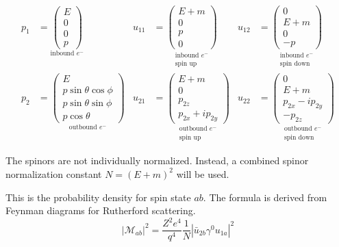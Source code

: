 \begin{align*}
p_1&=\underset{\text{inbound $e^-$}}
{\begin{pmatrix}E\\0\\0\\p\end{pmatrix}}
& u_{11}&=\underset{\substack{\text{inbound $e^-$}\\\text{spin up}}}
{\begin{pmatrix}E+m\\0\\p\\0\end{pmatrix}}
& u_{12}&=\underset{\substack{\text{inbound $e^-$}\\\text{spin down}}}
{\begin{pmatrix}0\\E+m\\0\\-p\end{pmatrix}}
\\[1ex]
p_2&=
\underset{\text{outbound $e^-$}}
{\begin{pmatrix}
E\\
p\sin\theta\cos\phi\\
p\sin\theta\sin\phi\\
p\cos\theta
\end{pmatrix}}
& u_{21}&=\underset{\substack{\text{outbound $e^-$}\\\text{spin up}}}
{\begin{pmatrix}E+m\\0\\p_{2z}\\p_{2x}+ip_{2y}\end{pmatrix}}
& u_{22}&=\underset{\substack{\text{outbound $e^-$}\\\text{spin down}}}
{\begin{pmatrix}0\\E+m\\p_{2x}-ip_{2y}\\-p_{2z}\end{pmatrix}}
\end{align*}
\fi

The spinors are not individually normalized.
Instead, a combined spinor normalization constant $N=(E+m)^2$ will be used.

\bigskip
This is the probability density for spin state $ab$.
The formula is derived from Feynman diagrams for Rutherford scattering.
\begin{equation*}
|\mathcal{M}_{ab}|^2=\frac{Z^2e^4}{q^4}\frac{1}{N}\left|\bar{u}_{2b}\gamma^0 u_{1a}\right|^2
\end{equation*}

